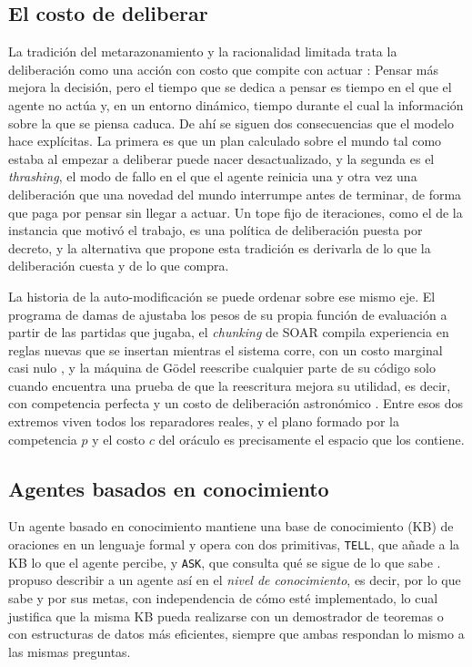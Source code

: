 \subsection{El costo de deliberar}

La tradición del metarazonamiento y la racionalidad limitada trata la deliberación como una acción con costo que compite con actuar \parencite{russell1991right,zilberstein2011metareasoning}: Pensar más mejora la decisión, pero el tiempo que se dedica a pensar es tiempo en el que el agente no actúa y, en un entorno dinámico, tiempo durante el cual la información sobre la que se piensa caduca. De ahí se siguen dos consecuencias que el modelo hace explícitas. La primera es que un plan calculado sobre el mundo tal como estaba al empezar a deliberar puede nacer desactualizado, y la segunda es el \emph{thrashing}, el modo de fallo en el que el agente reinicia una y otra vez una deliberación que una novedad del mundo interrumpe antes de terminar, de forma que paga por pensar sin llegar a actuar. Un tope fijo de iteraciones, como el de la instancia que motivó el trabajo, es una política de deliberación puesta por decreto, y la alternativa que propone esta tradición es derivarla de lo que la deliberación cuesta y de lo que compra.

La historia de la auto-modificación se puede ordenar sobre ese mismo eje. El programa de damas de \textcite{samuel1959some} ajustaba los pesos de su propia función de evaluación a partir de las partidas que jugaba, el \emph{chunking} de SOAR compila experiencia en reglas nuevas que se insertan mientras el sistema corre, con un costo marginal casi nulo \parencite{laird2012soar}, y la máquina de Gödel reescribe cualquier parte de su código solo cuando encuentra una prueba de que la reescritura mejora su utilidad, es decir, con competencia perfecta y un costo de deliberación astronómico \parencite{schmidhuber2003goedel}. Entre esos dos extremos viven todos los reparadores reales, y el plano formado por la competencia $p$ y el costo $c$ del oráculo es precisamente el espacio que los contiene.

\subsection{Agentes basados en conocimiento}

Un agente basado en conocimiento mantiene una base de conocimiento (KB) de oraciones en un lenguaje formal y opera con dos primitivas, \texttt{TELL}, que añade a la KB lo que el agente percibe, y \texttt{ASK}, que consulta qué se sigue de lo que sabe \parencite[§7.1]{russellNorvig2020}. \textcite{newell1982knowledge} propuso describir a un agente así en el \emph{nivel de conocimiento}, es decir, por lo que sabe y por sus metas, con independencia de cómo esté implementado, lo cual justifica que la misma KB pueda realizarse con un demostrador de teoremas o con estructuras de datos más eficientes, siempre que ambas respondan lo mismo a las mismas preguntas.

